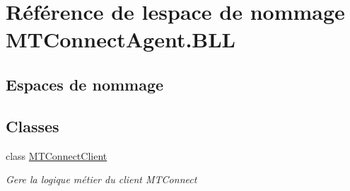 \hypertarget{namespace_m_t_connect_agent_1_1_b_l_l}{}\section{Référence de l\textquotesingle{}espace de nommage M\+T\+Connect\+Agent.\+B\+LL}
\label{namespace_m_t_connect_agent_1_1_b_l_l}
\subsection*{Espaces de nommage}
\begin{DoxyCompactItemize}
\end{DoxyCompactItemize}
\subsection*{Classes}
\begin{DoxyCompactItemize}
\item 
class \mbox{\hyperlink{class_m_t_connect_agent_1_1_b_l_l_1_1_m_t_connect_client}{M\+T\+Connect\+Client}}
\begin{DoxyCompactList}\small\item\em Gere la logique métier du client M\+T\+Connect \end{DoxyCompactList}\end{DoxyCompactItemize}
